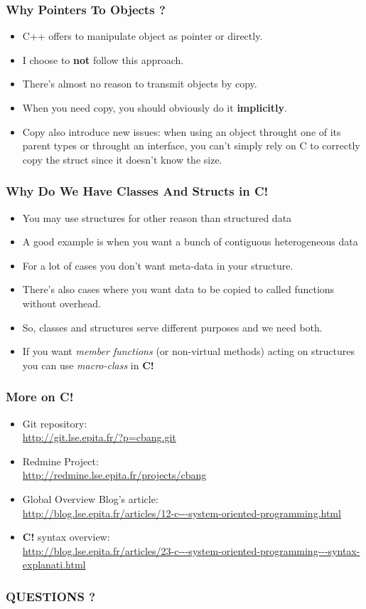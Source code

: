 \documentclass{beamer}
\newcommand{\cbang}{{\bf C!}}
\begin{document}
\begin{frame}
  \frametitle{Why Pointers To Objects ?}
  \begin{itemize}
  \item C++ offers to manipulate object as pointer or directly.
  \item I choose to \textbf{not} follow this approach.
  \item There's almost no reason to transmit objects by copy.
  \item When you need copy, you should obviously do it \textbf{implicitly}.
  \item Copy also introduce new issues: when using an object throught one of
    its parent types or throught an interface, you can't simply rely on C to
    correctly copy the struct since it doesn't know the size.
  \end{itemize}
\end{frame}

\begin{frame}
  \frametitle{Why Do We Have Classes And Structs in \cbang{}}
  \begin{itemize}
  \item You may use structures for other reason than structured data
  \item A good example is when you want a bunch of contiguous heterogeneous
    data
  \item For a lot of cases you don't want meta-data in your structure.
  \item There's also cases where you want data to be copied to called
    functions without overhead.
  \item So, classes and structures serve different purposes and we need both.
  \item If you want \emph{member functions} (or non-virtual methods) acting on
    structures you can use \emph{macro-class} in \cbang
  \end{itemize}
\end{frame}

\begin{frame}
  \frametitle{More on \cbang{}}
  \begin{itemize}
  \item Git repository:\\ {\footnotesize
      \url{http://git.lse.epita.fr/?p=cbang.git}}
  \item Redmine Project:\\ {\footnotesize
      \url{http://redmine.lse.epita.fr/projects/cbang}}
  \item Global Overview Blog's article:\\ {\footnotesize
      \url{http://blog.lse.epita.fr/articles/12-c---system-oriented-programming.html}}
  \item \cbang{} syntax overview:\\ {\footnotesize
      \url{http://blog.lse.epita.fr/articles/23-c---system-oriented-programming---syntax-explanati.html}}
  \end{itemize}
\end{frame}


\begin{frame}
  \frametitle{QUESTIONS ?}
  \begin{center}
  \end{center}
\end{frame}
\end{document}

